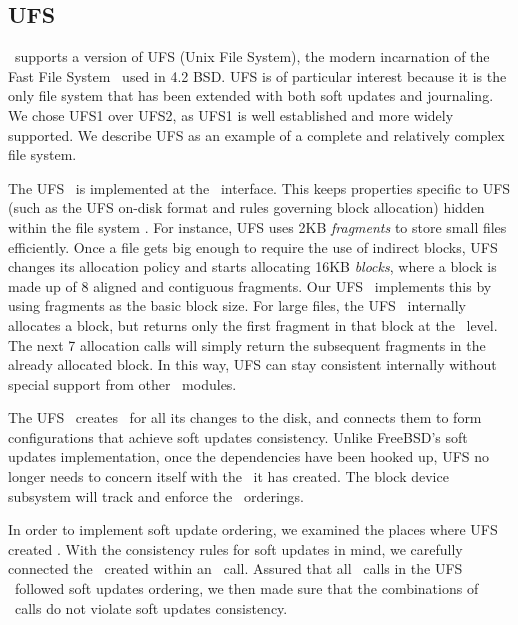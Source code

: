 \subsection{UFS}
\label{sec:using:ufs}

\Kudos\ supports a version of UFS (Unix File System), the modern incarnation of
the Fast File System~\cite{mckusick84fast} used in 4.2 BSD. UFS is of
particular interest because it is the only file system that has been extended
with both soft updates and journaling.~\cite{seltzer00journaling} We chose UFS1
over UFS2, as UFS1 is well established and more widely supported. We describe
UFS as an example of a complete and relatively complex file system.

The UFS \module\ is implemented at the \LFS\ interface. This keeps properties
specific to UFS (such as the UFS on-disk format and rules governing block
allocation) hidden within the file system \module. For instance, UFS uses 2KB
\emph{fragments} to store small files efficiently. Once a file gets big enough
to require the use of indirect blocks, UFS changes its allocation policy and
starts allocating 16KB \emph{blocks}, where a block is made up of 8 aligned and
contiguous fragments. Our UFS \module\ implements this by using fragments as
the basic block size. For large files, the UFS \module\ internally allocates a
block, but returns only the first fragment in that block at the \LFS\ level.
The next 7 allocation calls will simply return the subsequent fragments in the
already allocated block. In this way, UFS can stay consistent internally
without special support from other \Kudos\ modules.

The UFS \module\ creates \chdescs\ for all its changes to the disk, and
connects them to form configurations that achieve soft updates consistency.
Unlike FreeBSD's soft updates implementation, once the dependencies have been
hooked up, UFS no longer needs to concern itself with the \chdescs\ it has
created. The block device subsystem will track and enforce the \chdesc\
orderings.

In order to implement soft update ordering, we examined the places where UFS
created \chdescs. With the consistency rules for soft updates in mind, we
carefully connected the \chdescs\ created within an \LFS\ call. Assured that
all \LFS\ calls in the UFS \module\ followed soft updates ordering, we then
made sure that the combinations of \LFS\ calls do not violate soft updates
consistency.\todo{Which is to say, we trusted UHFS...}

